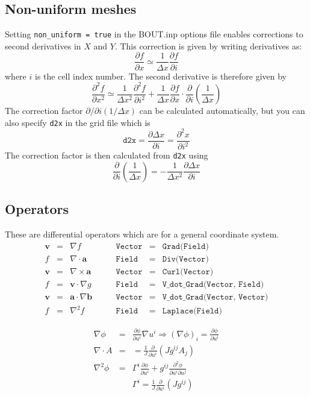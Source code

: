 \documentclass[12pt]{article}
\newcommand{\code}[1]{\texttt{#1}}
\newcommand{\deriv}[2]{\ensuremath{\frac{\partial #1}{\partial #2}}}
\begin{document}
\subsection{Non-uniform meshes}
Setting \texttt{non\_uniform = true} in the BOUT.inp options file
enables corrections to second derivatives in $X$ and $Y$. This correction
is given by writing derivatives as:
\[
\deriv{f}{x} \simeq \frac{1}{\Delta x} \deriv{f}{i}
\]
where $i$ is the cell index number. The second derivative is therefore given by
\[
\frac{\partial^2 f}{\partial x^2} \simeq \frac{1}{\Delta x^2}\frac{\partial^2 f}{\partial i^2} + \frac{1}{\Delta x}\deriv{f}{x} \cdot \deriv{}{i}\left(\frac{1}{\Delta x}\right)
\]
The correction factor $\partial/\partial i\left(1/\Delta x\right)$ can be
calculated automatically, but you can also specify \texttt{d2x} in the grid file which is
\[
\texttt{d2x} = \deriv{\Delta x}{i} = \frac{\partial^2 x}{\partial i^2}
\]
The correction factor is then calculated from \texttt{d2x} using
\[
\deriv{}{i}\left(\frac{1}{\Delta x}\right) = -\frac{1}{\Delta x^2} \deriv{\Delta x}{i}
\]


\subsection{Operators}

These are differential operators which are for a general coordinate system.
\[
\begin{array}{rclrcl}
\mathbf{v} &=& \nabla f &\qquad \code{Vector} &=& \code{Grad(Field)} \\
f &=& \nabla\cdot\mathbf{a} &\qquad \code{Field} &=& \code{Div(Vector)} \\
\mathbf{v} &=& \nabla\times\mathbf{a} &\qquad \code{Vector} &=& \code{Curl(Vector)} \\
f &=& \mathbf{v}\cdot\nabla g &\qquad \code{Field} &=& \code{V\_dot\_Grad(Vector, Field)} \\
\mathbf{v} &=& \mathbf{a}\cdot\nabla\mathbf{b} &\qquad \code{Vector} &=& \code{V\_dot\_Grad(Vector, Vector)} \\
f &=& \nabla^2 f &\qquad \code{Field} &=& \code{Laplace(Field)}
\end{array}
\]

\begin{eqnarray*}
\nabla\phi &=& \deriv{\phi}{u^i}\nabla u^i \Rightarrow \left(\nabla\phi\right)_i = \deriv{\phi}{u^i} \\
\nabla\cdot A &=& = \frac{1}{J}\deriv{}{u^i}\left(Jg^{ij}A_j\right) \\
\nabla^2\phi &=& \Gamma^i\deriv{\phi}{u^i} + g^{ij}\frac{\partial^2\phi}{\partial u^i\partial u^j} \\
& &\Gamma^i = \frac{1}{J}\deriv{}{u^i}\left(Jg^{ij}\right)
\end{eqnarray*}
\end{document}
